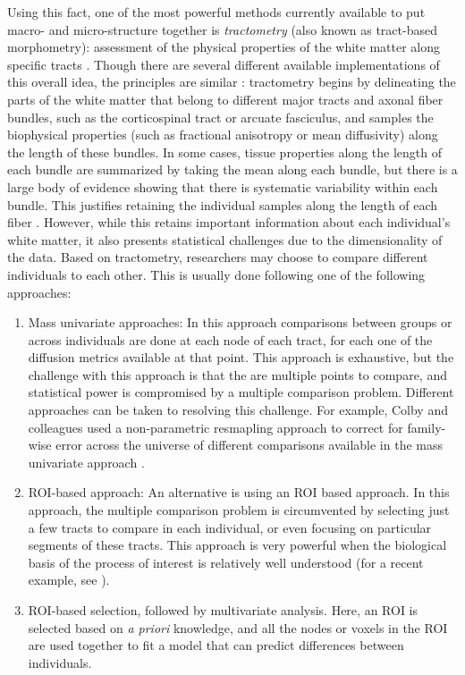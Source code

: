 Using this fact, one of the most powerful methods currently available to put
macro- and micro-structure together is \emph{tractometry} (also known as
tract-based morphometry): assessment of the physical properties of the white
matter along specific tracts \cite{Bells2011-cf}. Though there are several
different available implementations of this overall idea, the principles are
similar \cite{yeatman2012, Yendiki2011-ay, Wassermann2016-iv, ODonnell2009-uu}:
tractometry begins by delineating the parts of the white matter that belong to
different major tracts and axonal fiber bundles, such as the corticospinal tract
or arcuate fasciculus, and samples the biophysical properties (such as
fractional anisotropy or mean diffusivity) along the length of these bundles. In
some cases, tissue properties along the length of each bundle are summarized by
taking the mean along each bundle, but there is a large body of evidence showing
that there is systematic variability within each bundle. This justifies
retaining the individual samples along the length of each fiber
\cite{yeatman2012, colby2012, ODonnell2009-uu}. However, while this retains
important information about each individual's white matter, it also presents
statistical challenges due to the dimensionality of the data. Based on
tractometry, researchers may choose to compare different individuals to each
other. This is usually done following one of the following approaches:

\begin{enumerate}

\item Mass univariate approaches: In this approach comparisons between groups or
across individuals are done at each node of each tract, for each one of the
diffusion metrics available at that point. This approach is exhaustive, but the
challenge with this approach is that the are multiple points to compare, and
statistical power is compromised by a multiple comparison problem. Different
approaches can be taken to resolving this challenge. For example, Colby and
colleagues \cite{colby2012} used a non-parametric resmapling approach to correct
for family-wise error across the universe of different comparisons available in
the mass univariate approach \cite{Nichols2002-zu, Nichols2003-yy}.

\item ROI-based approach: An alternative is using an ROI based approach. In this
approach, the multiple comparison problem is circumvented by selecting just a
few tracts to compare in each individual, or even focusing on particular
segments of these tracts. This approach is very powerful when the biological
basis of the process of interest is relatively well understood (for a recent
example, see \cite{huber2018rapid}).

\item ROI-based selection, followed by multivariate analysis. Here, an ROI is
selected based on \emph{a priori} knowledge, and all the nodes or voxels in the
ROI are used together to fit a model that can predict differences between
individuals.

\end{enumerate}

